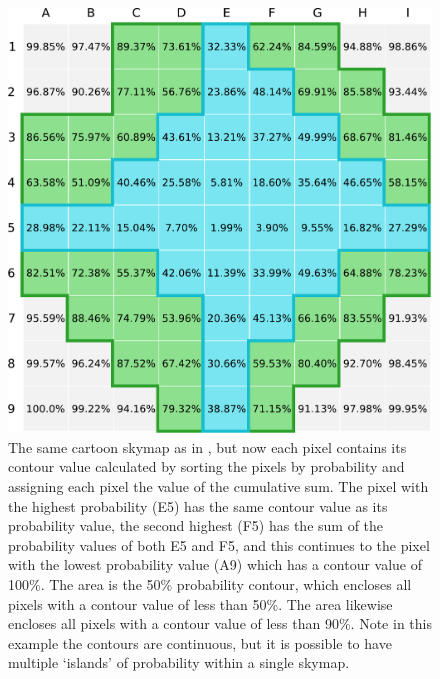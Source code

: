 \begin{colsection}
\begin{colsection}
\clearpage

\begin{figure}[t]
    \begin{center}
        \includegraphics[width=0.95\linewidth]{images/sim/sim_skymap_conts.pdf}
    \end{center}
    \caption[An example 2D skymap with pixel contour values]{
        The same cartoon skymap as in , but now each pixel contains its contour value calculated by sorting the pixels by probability and assigning each pixel the value of the cumulative sum. The pixel with the highest probability (E5) has the same contour value as its probability value, the second highest (F5) has the sum of the probability values of both E5 and F5, and this continues to the pixel with the lowest probability value (A9) which has a contour value of 100\%. The  area is the 50\% probability contour, which encloses all pixels with a contour value of less than 50\%. The  area likewise encloses all pixels with a contour value of less than 90\%. Note in this example the contours are continuous, but it is possible to have multiple `islands' of probability within a single skymap.
    }\label{fig:sim_skymap_conts}
\end{figure}

\clearpage

\makeatletter
\setlength{\@fptop}{0\p@ \@plus 1fil} %
\makeatother


\end{colsection}
\end{colsection}
